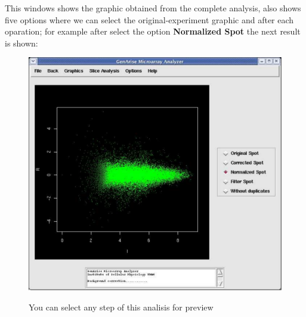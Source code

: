 \documentclass[12pt]{article}
\begin{document}
This windows shows the graphic obtained from the complete analysis, also shows five options where we can select the original-experiment graphic and after each oparation; for example after select the option \textbf{Normalized Spot} the next result is shown:
\begin{figure}[h]
\begin{center}
\includegraphics[scale= 0.3]{./images/wizardNorm.pdf}\\
\caption{You can select any step of this analisis for preview \label{fig9}}
\end{center}
\end{figure}
\end{document}
